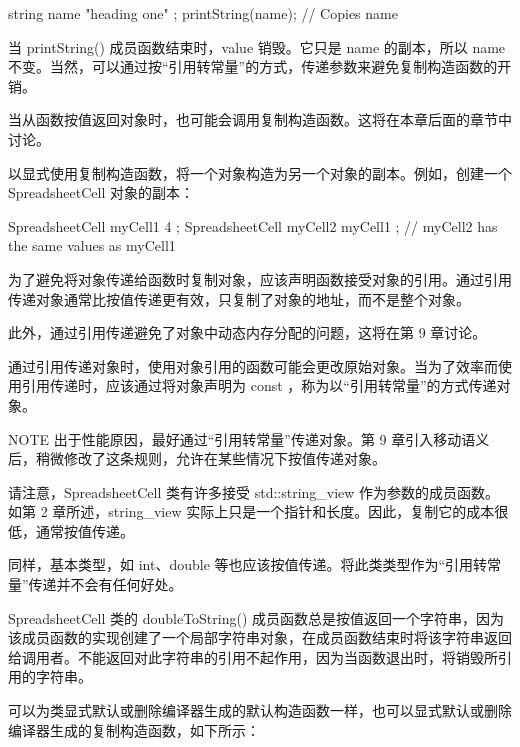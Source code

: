 \begin{cpp}
string name { "heading one" };
printString(name); // Copies name
\end{cpp}

当 printString() 成员函数结束时，value 销毁。它只是 name 的副本，所以 name 不变。当然，可以通过按“引用转常量”的方式，传递参数来避免复制构造函数的开销。

当从函数按值返回对象时，也可能会调用复制构造函数。这将在本章后面的章节中讨论。


以显式使用复制构造函数，将一个对象构造为另一个对象的副本。例如，创建一个 SpreadsheetCell 对象的副本：

\begin{cpp}
SpreadsheetCell myCell1 { 4 };
SpreadsheetCell myCell2 { myCell1 }; // myCell2 has the same values as myCell1
\end{cpp}


为了避免将对象传递给函数时复制对象，应该声明函数接受对象的引用。通过引用传递对象通常比按值传递更有效，只复制了对象的地址，而不是整个对象。

此外，通过引用传递避免了对象中动态内存分配的问题，这将在第 9 章讨论。

通过引用传递对象时，使用对象引用的函数可能会更改原始对象。当为了效率而使用引用传递时，应该通过将对象声明为 const ，称为以“引用转常量”的方式传递对象。

\begin{myNotic}{NOTE}
出于性能原因，最好通过“引用转常量”传递对象。第 9 章引入移动语义后，稍微修改了这条规则，允许在某些情况下按值传递对象。
\end{myNotic}

请注意，SpreadsheetCell 类有许多接受 std::string\_view 作为参数的成员函数。如第 2 章所述，string\_view 实际上只是一个指针和长度。因此，复制它的成本很低，通常按值传递。

同样，基本类型，如 int、double 等也应该按值传递。将此类类型作为“引用转常量”传递并不会有任何好处。

SpreadsheetCell 类的 doubleToString() 成员函数总是按值返回一个字符串，因为该成员函数的实现创建了一个局部字符串对象，在成员函数结束时将该字符串返回给调用者。不能返回对此字符串的引用不起作用，因为当函数退出时，将销毁所引用的字符串。


可以为类显式默认或删除编译器生成的默认构造函数一样，也可以显式默认或删除编译器生成的复制构造函数，如下所示：

